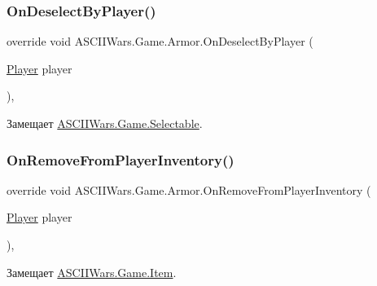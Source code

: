 \subsubsection{\texorpdfstring{On\+Deselect\+By\+Player()}{OnDeselectByPlayer()}}
{\footnotesize\ttfamily override void A\+S\+C\+I\+I\+Wars.\+Game.\+Armor.\+On\+Deselect\+By\+Player (\begin{DoxyParamCaption}\item[{\hyperlink{class_a_s_c_i_i_wars_1_1_game_1_1_player}{Player}}]{player }\end{DoxyParamCaption})\hspace{0.3cm}{\ttfamily [inline]}, {\ttfamily [virtual]}}



Замещает \hyperlink{class_a_s_c_i_i_wars_1_1_game_1_1_selectable_a08a30c8786367bf45355e989b109c44b}{A\+S\+C\+I\+I\+Wars.\+Game.\+Selectable}.

\hypertarget{class_a_s_c_i_i_wars_1_1_game_1_1_armor_ab113733825094b12aba14b8b48372f9c}{}\label{class_a_s_c_i_i_wars_1_1_game_1_1_armor_ab113733825094b12aba14b8b48372f9c} 
\subsubsection{\texorpdfstring{On\+Remove\+From\+Player\+Inventory()}{OnRemoveFromPlayerInventory()}}
{\footnotesize\ttfamily override void A\+S\+C\+I\+I\+Wars.\+Game.\+Armor.\+On\+Remove\+From\+Player\+Inventory (\begin{DoxyParamCaption}\item[{\hyperlink{class_a_s_c_i_i_wars_1_1_game_1_1_player}{Player}}]{player }\end{DoxyParamCaption})\hspace{0.3cm}{\ttfamily [inline]}, {\ttfamily [virtual]}}



Замещает \hyperlink{class_a_s_c_i_i_wars_1_1_game_1_1_item_a52412546f837bfc65a3aa9d728fa142f}{A\+S\+C\+I\+I\+Wars.\+Game.\+Item}.

\hypertarget{class_a_s_c_i_i_wars_1_1_game_1_1_armor_ab4f8a39af009eef4bbdeb6db67fb9cd5}{}\label{class_a_s_c_i_i_wars_1_1_game_1_1_armor_ab4f8a39af009eef4bbdeb6db67fb9cd5} 
